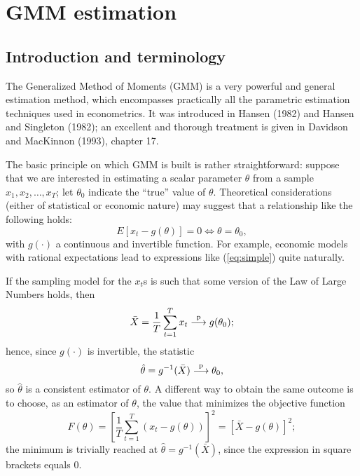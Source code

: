 \chapter{GMM estimation}
\label{chap:gmm}

\section{Introduction and terminology}
\label{sec:gmm-intro}

The Generalized Method of Moments (GMM) is a very powerful and general
estimation method, which encompasses practically all the parametric
estimation techniques used in econometrics. It was introduced in
Hansen (1982) and Hansen and Singleton (1982); an excellent and
thorough treatment is given in Davidson and MacKinnon (1993), chapter
17.

The basic principle on which GMM is built is rather straightforward:
suppose that we are interested in estimating a scalar parameter
$\theta$ from a sample $x_1, x_2, \ldots, x_T$; let $\theta_0$
indicate the ``true'' value of $\theta$. Theoretical considerations
(either of statistical or economic nature) may suggest that a
relationship like the following holds:
\begin{equation}
  \label{eq:simple}
  E \left[ x_t - g(\theta) \right] = 0 \Leftrightarrow \theta =
  \theta_0 ,
\end{equation}
with $g(\cdot)$ a continuous and invertible function. For example,
economic models with rational expectations lead to expressions like
(\ref{eq:simple}) quite naturally.

If the sampling model for the $x_t$s is such that some version of the
Law of Large Numbers holds, then
\[
  \bar{X} = \frac{1}{T} \sum_{t=1}^T x_t \stackrel{\mathrm{p}}{\longrightarrow} g(\theta_0) ;
\]
hence, since $g(\cdot)$ is invertible, the statistic
\[
  \hat{\theta} = g^{-1}(\bar{X}) \stackrel{\mathrm{p}}{\longrightarrow} \theta_0 ,
\]
so $\hat{\theta}$ is a consistent estimator of $\theta$. A different
way to obtain the same outcome is to choose, as an estimator of
$\theta$, the value that minimizes the objective function
\begin{equation}
  \label{eq:obj-simple}
  F(\theta) = \left[ \frac{1}{T} \sum_{t=1}^T (x_t  - g(\theta)) \right]^2 =
  \left[ \bar{X} - g(\theta) \right]^2 ;
\end{equation}
the minimum is trivially reached at $\hat{\theta} = g^{-1}(\bar{X})$,
since the expression in square brackets equals 0.

